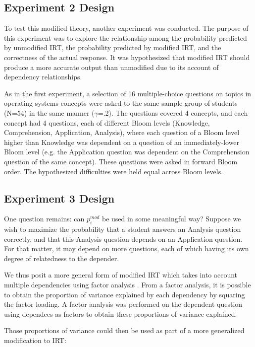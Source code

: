 \subsection{Experiment 2 Design}

To test this modified theory, another experiment was conducted.  The purpose of
this experiment was to explore the relationship among the probability predicted
by unmodified IRT, the probability predicted by modified IRT, and the
correctness of the actual response.  It was hypothesized that modified IRT
should produce a more accurate output than unmodified due to its account of
dependency relationships.

As in the first experiment, a selection of 16 multiple-choice questions on
topics in operating systems concepts were asked to the same sample group of
students (N=54) in the same manner ($\gamma$=.2).  The questions covered 4
concepts, and each concept had 4 questions, each of different Bloom levels
(Knowledge, Comprehension, Application, Analysis), where each question of a
Bloom level higher than Knowledge was dependent on a question of an
immediately-lower Bloom level (e.g. the Application question was dependent on
the Comprehension question of the same concept).  These questions were asked in
forward Bloom order.  The hypothesized difficulties were held equal across
Bloom levels.

\subsection{Experiment 3 Design}

One question remains: can $p_i^{mod}$ be used in some meaningful way?  Suppose
we wish to maximize the probability that a student answers an Analysis question
correctly, and that this Analysis question depends on an Application question.
For that matter, it may depend on more questions, each of which having its own
degree of relatedness to the depender.

We thus posit a more general form of modified IRT which takes into account
multiple dependencies using factor analysis \cite{kim1978}.  From a factor
analysis, it is possible to obtain the proportion of variance explained by each
dependency by squaring the factor loading.  A factor analysis was performed on
the dependent question using dependees as factors to obtain these proportions
of variance explained.

Those proportions of variance could then be used as part of a more generalized
modification to IRT:

